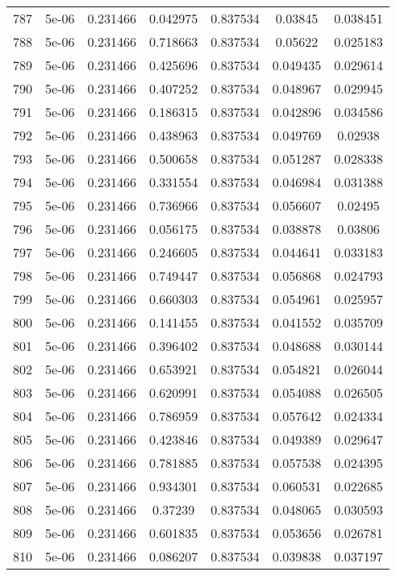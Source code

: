 \begin{table}
\begin{tabular*}{\linewidth}{c|c|c|c|c|c|c}
787 & 5e-06 & 0.231466 & 0.042975 & 0.837534 & 0.03845 & 0.038451\\
788 & 5e-06 & 0.231466 & 0.718663 & 0.837534 & 0.05622 & 0.025183\\
789 & 5e-06 & 0.231466 & 0.425696 & 0.837534 & 0.049435 & 0.029614\\
790 & 5e-06 & 0.231466 & 0.407252 & 0.837534 & 0.048967 & 0.029945\\
791 & 5e-06 & 0.231466 & 0.186315 & 0.837534 & 0.042896 & 0.034586\\
792 & 5e-06 & 0.231466 & 0.438963 & 0.837534 & 0.049769 & 0.02938\\
793 & 5e-06 & 0.231466 & 0.500658 & 0.837534 & 0.051287 & 0.028338\\
794 & 5e-06 & 0.231466 & 0.331554 & 0.837534 & 0.046984 & 0.031388\\
795 & 5e-06 & 0.231466 & 0.736966 & 0.837534 & 0.056607 & 0.02495\\
796 & 5e-06 & 0.231466 & 0.056175 & 0.837534 & 0.038878 & 0.03806\\
797 & 5e-06 & 0.231466 & 0.246605 & 0.837534 & 0.044641 & 0.033183\\
798 & 5e-06 & 0.231466 & 0.749447 & 0.837534 & 0.056868 & 0.024793\\
799 & 5e-06 & 0.231466 & 0.660303 & 0.837534 & 0.054961 & 0.025957\\
800 & 5e-06 & 0.231466 & 0.141455 & 0.837534 & 0.041552 & 0.035709\\
801 & 5e-06 & 0.231466 & 0.396402 & 0.837534 & 0.048688 & 0.030144\\
802 & 5e-06 & 0.231466 & 0.653921 & 0.837534 & 0.054821 & 0.026044\\
803 & 5e-06 & 0.231466 & 0.620991 & 0.837534 & 0.054088 & 0.026505\\
804 & 5e-06 & 0.231466 & 0.786959 & 0.837534 & 0.057642 & 0.024334\\
805 & 5e-06 & 0.231466 & 0.423846 & 0.837534 & 0.049389 & 0.029647\\
806 & 5e-06 & 0.231466 & 0.781885 & 0.837534 & 0.057538 & 0.024395\\
807 & 5e-06 & 0.231466 & 0.934301 & 0.837534 & 0.060531 & 0.022685\\
808 & 5e-06 & 0.231466 & 0.37239 & 0.837534 & 0.048065 & 0.030593\\
809 & 5e-06 & 0.231466 & 0.601835 & 0.837534 & 0.053656 & 0.026781\\
810 & 5e-06 & 0.231466 & 0.086207 & 0.837534 & 0.039838 & 0.037197\\
\end{tabular*}
\end{table}
